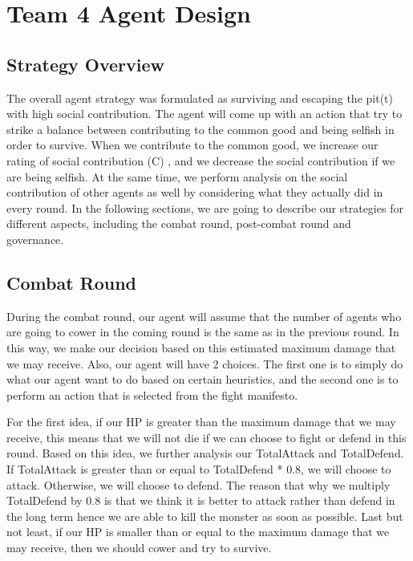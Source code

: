 \chapter{Team 4 Agent Design}\label{team_4_agent_design}

\section{Strategy Overview}

\par The overall agent strategy was formulated as surviving and escaping the pit(t) with high social contribution. The agent will come up with an action that try to strike a balance between contributing to the common good and being selfish in order to survive. When we contribute to the common good, we increase our rating of social contribution (C) , and we decrease the social contribution if we are being selfish. At the same time, we perform analysis on the social contribution of other agents as well by considering what they actually did in every round. In the following sections, we are going to describe our strategies for different aspects, including the combat round, post-combat round and governance.

\section{Combat Round}

\par During the combat round, our agent will assume that the number of agents who are going to cower in the coming round is the same as in the previous round. In this way, we make our decision based on this estimated maximum damage that we may receive. Also, our agent will have 2 choices. The first one is to simply do what our agent want to do based on certain heuristics, and the second one is to perform an action that is selected from the fight manifesto.

\par For the first idea, if our HP is greater than the maximum damage that we may receive, this means that we will not die if we can choose to fight or defend in this round. Based on this idea, we further analysis our TotalAttack and TotalDefend. If TotalAttack is greater than or equal to TotalDefend * 0.8, we will choose to attack. Otherwise, we will choose to defend. The reason that why we multiply TotalDefend by 0.8 is that we think it is better to attack rather than defend in the long term hence we are able to kill the monster as soon as possible. Last but not least, if our HP is smaller than or equal to the maximum damage that we may receive, then we should cower and try to survive.


